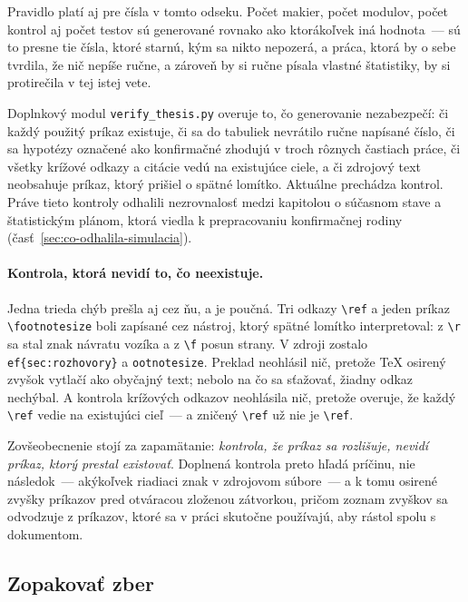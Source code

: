 Pravidlo platí aj pre čísla v tomto odseku. Počet makier, počet modulov, počet kontrol aj počet testov sú generované rovnako ako ktorákoľvek iná hodnota~--- sú to presne tie čísla, ktoré starnú, kým sa nikto nepozerá, a práca, ktorá by o sebe tvrdila, že nič nepíše ručne, a zároveň by si ručne písala vlastné štatistiky, by si protirečila v tej istej vete.

Doplnkový modul \texttt{verify\_thesis.py} overuje to, čo generovanie nezabezpečí: či každý použitý príkaz existuje, či sa do tabuliek nevrátilo ručne napísané číslo, či sa hypotézy označené ako konfirmačné zhodujú v troch rôznych častiach práce, či všetky krížové odkazy a citácie vedú na existujúce ciele, a či zdrojový text neobsahuje príkaz, ktorý prišiel o spätné lomítko. Aktuálne prechádza \repoChecks{} kontrol. Práve tieto kontroly odhalili nezrovnalosť medzi kapitolou o súčasnom stave a štatistickým plánom, ktorá viedla k prepracovaniu konfirmačnej rodiny (časť~\ref{sec:co-odhalila-simulacia}).

\paragraph{Kontrola, ktorá nevidí to, čo neexistuje.} Jedna trieda chýb prešla aj cez ňu, a je poučná. Tri odkazy \verb|\ref| a jeden príkaz \verb|\footnotesize| boli zapísané cez nástroj, ktorý spätné lomítko interpretoval: z \verb|\r| sa stal znak návratu vozíka a z \verb|\f| posun strany. V zdroji zostalo \verb|ef{sec:rozhovory}| a \verb|ootnotesize|. Preklad neohlásil nič, pretože \TeX{} osirený zvyšok vytlačí ako obyčajný text; nebolo na čo sa sťažovať, žiadny odkaz nechýbal. A kontrola krížových odkazov neohlásila nič, pretože overuje, že každý \verb|\ref| vedie na existujúci cieľ~--- a zničený \verb|\ref| už nie je \verb|\ref|.

Zovšeobecnenie stojí za zapamätanie: \emph{kontrola, že príkaz sa rozlišuje, nevidí príkaz, ktorý prestal existovať}. Doplnená kontrola preto hľadá príčinu, nie následok~--- akýkoľvek riadiaci znak v zdrojovom súbore~--- a k tomu osirené zvyšky príkazov pred otváracou zloženou zátvorkou, pričom zoznam zvyškov sa odvodzuje z príkazov, ktoré sa v práci skutočne používajú, aby rástol spolu s dokumentom.

\subsection{Zopakovať zber}

